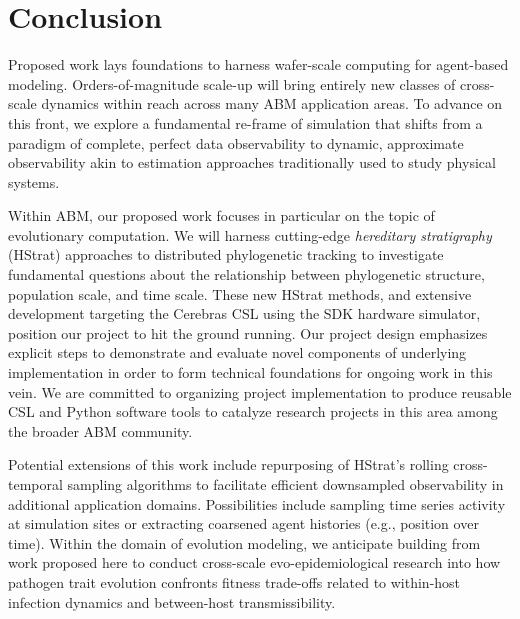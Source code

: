 \section{Conclusion} \label{sec:conclusion}

Proposed work lays foundations to harness wafer-scale computing for agent-based modeling.
Orders-of-magnitude scale-up will bring entirely new classes of cross-scale dynamics within reach across many ABM application areas.
To advance on this front, we explore a fundamental re-frame of simulation that shifts from a paradigm of complete, perfect data observability to dynamic, approximate observability akin to estimation approaches traditionally used to study physical systems.

Within ABM, our proposed work focuses in particular on the topic of evolutionary computation.
We will harness cutting-edge \textit{hereditary stratigraphy} (HStrat) approaches to distributed phylogenetic tracking to investigate fundamental questions about the relationship between phylogenetic structure, population scale, and time scale.
These new HStrat methods, and extensive development targeting the Cerebras CSL using the SDK hardware simulator, position our project to hit the ground running.
Our project design emphasizes explicit steps to demonstrate and evaluate novel components of underlying implementation in order to form technical foundations for ongoing work in this vein.
We are committed to organizing project implementation to produce reusable CSL and Python software tools to catalyze research projects in this area among the broader ABM community.

Potential extensions of this work include repurposing of HStrat's rolling cross-temporal sampling algorithms to facilitate efficient downsampled observability in additional application domains.
Possibilities include sampling time series activity at simulation sites or extracting coarsened agent histories (e.g., position over time).
Within the domain of evolution modeling, we anticipate building from work proposed here to conduct cross-scale evo-epidemiological research into how pathogen trait evolution confronts fitness trade-offs related to within-host infection dynamics and between-host transmissibility.
